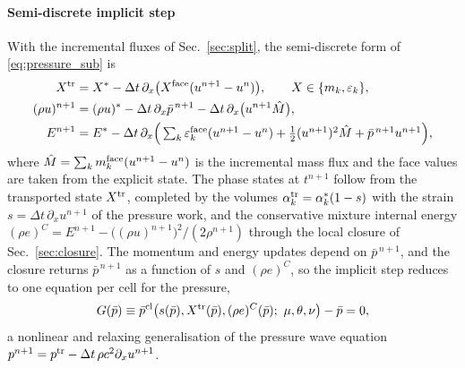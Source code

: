 \paragraph{Semi-discrete implicit step}
With the incremental fluxes of Sec.~\ref{sec:split}, the semi-discrete form of \eqref{eq:pressure_sub} is
\begin{equation}
\begin{aligned}
X^{\rm tr}&=X^*-\Delta t\,\partial_x\big(X^{\rm face}(u^{n+1}-u^n)\big),\qquad X\in\{m_k,\varepsilon_k\},\\
(\rho u)^{n+1}&=(\rho u)^*-\Delta t\,\partial_x\bar p^{\,n+1}-\Delta t\,\partial_x\big(u^{n+1}\hat M\big),\\
E^{n+1}&=E^*-\Delta t\,\partial_x\Big(\textstyle\sum_k\varepsilon^{\rm face}_k(u^{n+1}-u^n)+\tfrac12(u^{n+1})^2\hat M+\bar p^{\,n+1}u^{n+1}\Big),
\end{aligned}
\label{eq:semidiscrete}
\end{equation}
where $\hat M=\sum_km^{\rm face}_k(u^{n+1}-u^n)$ is the incremental mass flux and the face values are taken from the explicit
state. The phase states at $t^{n+1}$ follow from the transported state $X^{\rm tr}$, completed by the volumes
$\alpha^{\rm tr}_k=\alpha^*_k(1-s)$ with the strain $s=\Delta t\,\partial_xu^{n+1}$ of the pressure work, and the conservative mixture internal energy
$(\rho e)^C=E^{n+1}-\big((\rho u)^{n+1}\big)^2/(2\rho^{n+1})$ through the local closure of Sec.~\ref{sec:closure}. The momentum and energy updates depend on $\bar p^{\,n+1}$, and the closure returns $\bar p^{\,n+1}$ as a function of
$s$ and $(\rho e)^C$, so the implicit step reduces to one equation per cell for the pressure,
\begin{equation}
G(\bar p)\equiv\bar p^{\rm cl}\big(s(\bar p),X^{\rm tr}(\bar p),(\rho e)^C(\bar p);\ \mu,\theta,\nu\big)-\bar p=0 ,
\label{eq:global_semi}
\end{equation}
a nonlinear and relaxing generalisation of the pressure wave equation $p^{n+1}=p^{\rm tr}-\Delta t\,\rho c^2\partial_xu^{n+1}$.

